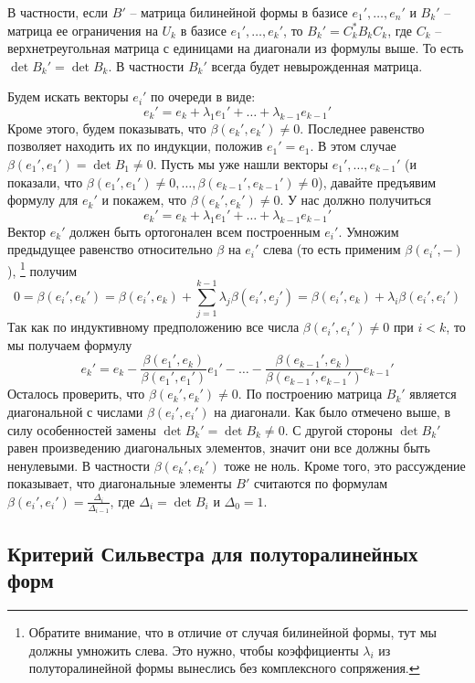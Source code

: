 В частности, если $B'$ -- матрица билинейной формы в базисе $e_1',\ldots,e_n'$ и $B_k'$ -- матрица ее ограничения на $U_k$ в базисе $e_1',\ldots,e_k'$, то $B_k' = C_k^* B_k C_k$, где $C_k$ -- верхнетреугольная матрица с единицами на диагонали из формулы выше.
То есть $\det B_k' = \det B_k$.
В частности $B_k'$ всегда будет невырожденная матрица.

Будем искать векторы $e_i'$ по очереди в виде:
\[
e_k' = e_k + \lambda_1 e_1' + \ldots + \lambda_{k-1}e_{k-1}'
\]
Кроме этого, будем показывать, что $\beta(e_k',e_k')\neq 0$.
Последнее равенство позволяет находить их по индукции, положив $e_1' = e_1$.
В этом случае $\beta(e_1',e_1') = \det B_1 \neq 0$.
Пусть мы уже нашли векторы $e_1',\ldots,e_{k-1}'$ (и показали, что $\beta(e_1',e_1')\neq 0,\ldots,\beta(e_{k-1}',e_{k-1}')\neq 0$), давайте предъявим формулу для $e_k'$ и покажем, что $\beta(e_k',e_k')\neq 0$.
У нас должно получиться
\[
e_k' = e_k + \lambda_1 e_1' + \ldots + \lambda_{k-1}e_{k-1}'
\]
Вектор $e_k'$ должен быть ортогонален всем построенным $e_i'$.
Умножим предыдущее равенство относительно $\beta$ на $e_i'$ слева (то есть применим $\beta(e_i',{-})$),%
\footnote{Обратите внимание, что в отличие от случая билинейной формы, тут мы должны умножить слева.
Это нужно, чтобы коэффициенты $\lambda_i$ из полуторалинейной формы вынеслись без комплексного сопряжения.}
получим
\[
0 = \beta(e_i',e_k') = \beta(e_i',e_k) +\sum_{j=1}^{k-1}\lambda_j \beta(e_i', e_j')
= \beta(e_i', e_k) + \lambda_i \beta(e_i', e_i')
\]
Так как по индуктивному предположению все числа $\beta(e_i',e_i') \neq 0$ при $i< k$, то мы получаем формулу
\[
e_k' = e_k - \frac{\beta(e_1', e_k)}{\beta(e_1',e_1')} e_1' - \ldots - \frac{\beta(e_{k-1}', e_k)}{\beta(e_{k-1}',e_{k-1}')} e_{k-1}'
\]
Осталось проверить, что $\beta(e_k', e_k')\neq 0$.
По построению матрица $B_k'$ является диагональной с числами $\beta(e_i',e_i')$ на диагонали.
Как было отмечено выше, в силу особенностей замены $\det B_k' = \det B_k\neq 0$.
С другой стороны $\det B_k'$ равен произведению диагональных элементов, значит они все должны быть ненулевыми.
В частности $\beta(e_k',e_k')$ тоже не ноль.
Кроме того, это рассуждение показывает, что диагональные элементы $B'$ считаются по формулам $\beta(e_i',e_i') = \frac{\Delta_i}{\Delta_{i-1}}$, где $\Delta_i = \det B_i$ и $\Delta_0 = 1$.


\subsection{Критерий Сильвестра для полуторалинейных форм}

